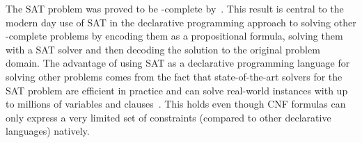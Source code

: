 The SAT problem was proved to be \NP-complete by~\textcite{DBLP:conf/stoc/Cook71}.
This result is central to the modern day use of SAT in the declarative programming approach to solving other \NP-complete problems by encoding them as a propositional formula, solving them with a SAT solver and then decoding the solution to the original problem domain.
The advantage of using SAT as a declarative programming language for solving other problems comes from the fact that state-of-the-art solvers for the SAT problem are efficient in practice and can solve real-world instances with up to millions of variables and clauses~\autocite{handbook2-cdcl}.
This holds even though CNF formulas can only express a very limited set of constraints (compared to other declarative languages) natively.

